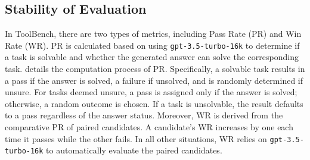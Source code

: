 

\subsection{Stability of Evaluation}
\label{sta_eval}

In ToolBench, there are two types of metrics, including Pass Rate (PR) and Win Rate (WR). 
PR is calculated based on using \texttt{gpt-3.5-turbo-16k} to determine if a task is solvable and whether the generated answer can solve the corresponding task.
 details the computation process of PR.
Specifically, a solvable task results in a pass if the answer is solved, a failure if unsolved, and is randomly determined if unsure.
For tasks deemed unsure, a pass is assigned only if the answer is solved; otherwise, a random outcome is chosen.
If a task is unsolvable, the result defaults to a pass regardless of the answer status.
Moreover, WR is derived from the comparative PR of paired candidates.
A candidate's WR increases by one each time it passes while the other fails.
In all other situations, WR relies on \texttt{gpt-3.5-turbo-16k} to automatically evaluate the paired candidates.




